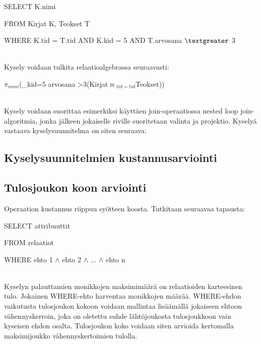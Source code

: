 \documentclass[finnish]{tktltiki2}
\theoremstyle{definition}
\theoremstyle{remark}
\begin{document}
\begin{frame}

SELECT K.nimi

FROM Kirjat K, Teokset T

WHERE K.tid = T.tid AND K.kid = 5 AND T.arvosana $\textgreater$  3
\end{frame}
\\
\newline
Kysely voidaan tulkita relaatioalgebrassa seuraavasti:

\begin{frame}

$\pi$$_{nimi}$(\sigma_{kid=5 \wedge arvosana \textgreater 3}(Kirjat$\Join$$ _{tid=tid}$Teokset))
\end{frame}
\\
\newline
Kysely voidaan suorittaa esimerkiksi käyttäen join-operaatiossa nested loop join-algoritmia, jonka jälkeen jokaiselle riville suoritetaan 
valinta ja projektio. Kyselyä vastaava kyselysuunnitelma on siten seuraava:

\subsection{Kyselysuunnitelmien kustannusarviointi}

\subsection{Tulosjoukon koon arviointi}
Operaation kustannus riippuu syötteen koosta. Tutkitaan seuraavaa tapausta:
\newline

\begin{frame}

SELECT attribuuttit

FROM relaatiot

WHERE ehto 1 $\wedge$ ehto 2 $\wedge$ ... $\wedge$ ehto n
\end{frame}
\\
\newline
Kyselyn palauttamien monikkojen maksimimäärä on relaatioiden karteesinen tulo. Jokainen WHERE-ehto harventaa monikkojen määrää. WHERE-ehdon vaikutusta tulosjoukon kokoon voidaan mallintaa lisäämällä jokaiseen ehtoon vähennyskerroin, joka on oletettu suhde lähtöjoukosta tulosjoukkoon vain kyseisen ehdon osalta.
Tulosjoukon koko voidaan siten arvioida kertomalla maksimijoukko vähennyskertoimien tulolla. \cite{ramakrishnan2003database}
\end{document}
